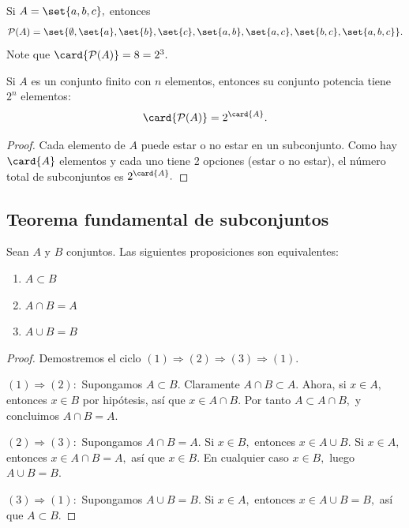 	\begin{problema}
		Si $A = \set{a,b,c},$ entonces
		$$
		\mathcal{P}(A) = \set{\emptyset, \set{a}, \set{b}, \set{c}, \set{a,b}, \set{a,c}, \set{b,c}, \set{a,b,c}}.
		$$
		Note que $\card{\mathcal{P}(A)} = 8 = 2^{3}.$
	\end{problema}

	\begin{teorema}
		Si $A$ es un conjunto finito con $n$ elementos, entonces su conjunto potencia tiene $2^{n}$ elementos:
		$$
		\card{\mathcal{P}(A)} = 2^{\card{A}}.
		$$
	\end{teorema}

	\begin{proof}
		Cada elemento de $A$ puede estar o no estar en un subconjunto.  Como hay $\card{A}$ elementos y cada uno tiene 2 opciones (estar o no estar), el número total de subconjuntos es $2^{\card{A}}.$
	\end{proof}

\subsection{Teorema fundamental de subconjuntos}

	\begin{teorema}
		Sean $A$ y $B$ conjuntos.  Las siguientes proposiciones son equivalentes:
		\begin{enumerate}
			\item $A \subset B$
			\item $A \cap B = A$
			\item $A \cup B = B$
		\end{enumerate}
	\end{teorema}

	\begin{proof}
		Demostremos el ciclo $(1) \Rightarrow (2) \Rightarrow (3) \Rightarrow (1).$
		
		$(1) \Rightarrow (2):$ Supongamos $A \subset B.$  Claramente $A \cap B \subset A.$  Ahora, si $x \in A,$ entonces $x \in B$ por hipótesis, así que $x \in A \cap B.$  Por tanto $A \subset A \cap B,$ y concluimos $A \cap B = A.$
		
		$(2) \Rightarrow (3):$ Supongamos $A \cap B = A.$  Si $x \in B,$ entonces $x \in A \cup B.$  Si $x \in A,$ entonces $x \in A \cap B = A,$ así que $x \in B.$  En cualquier caso $x \in B,$ luego $A \cup B = B.$
		
		$(3) \Rightarrow (1):$ Supongamos $A \cup B = B.$  Si $x \in A,$ entonces $x \in A \cup B = B,$ así que $A \subset B.$
	\end{proof}
